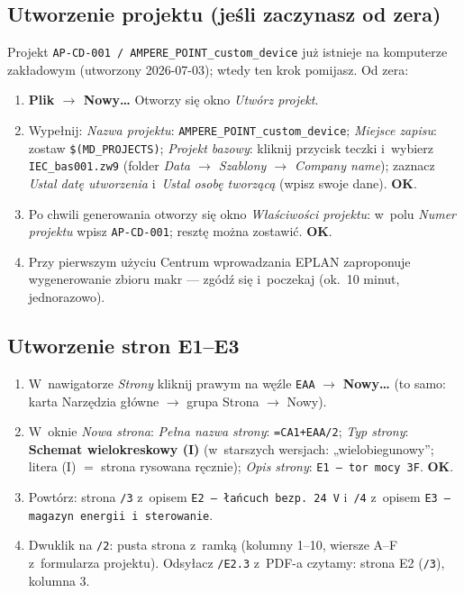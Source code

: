 \documentclass[11pt,a4paper]{article}
\begin{document}
\subsection{Utworzenie projektu (jeśli zaczynasz od zera)}
Projekt \texttt{AP-CD-001 / AMPERE\_POINT\_custom\_device} już istnieje na komputerze zakładowym
(utworzony 2026-07-03); wtedy ten krok pomijasz. Od zera:
\begin{enumerate}
\item \textbf{Plik $\to$ Nowy\ldots} Otworzy się okno \emph{Utwórz projekt}.
\item Wypełnij: \emph{Nazwa projektu}: \texttt{AMPERE\_POINT\_custom\_device}; \emph{Miejsce zapisu}:
zostaw \texttt{\$(MD\_PROJECTS)}; \emph{Projekt bazowy}: kliknij przycisk teczki i~wybierz
\texttt{IEC\_bas001.zw9} (folder \emph{Data $\to$ Szablony $\to$ Company name}); zaznacz
\emph{Ustal datę utworzenia} i~\emph{Ustal osobę tworzącą} (wpisz swoje dane). \textbf{OK}.
\item Po chwili generowania otworzy się okno \emph{Właściwości projektu}: w~polu \emph{Numer
projektu} wpisz \texttt{AP-CD-001}; resztę można zostawić. \textbf{OK}.
\item Przy pierwszym użyciu Centrum wprowadzania EPLAN zaproponuje wygenerowanie zbioru makr ---
zgódź się i~poczekaj (ok.~10 minut, jednorazowo).
\end{enumerate}

\subsection{Utworzenie stron E1--E3}
\begin{enumerate}
\item W~nawigatorze \emph{Strony} kliknij prawym na węźle \texttt{EAA} $\to$ \textbf{Nowy\ldots}
(to samo: karta Narzędzia główne $\to$ grupa Strona $\to$ Nowy).
\item W~oknie \emph{Nowa strona}: \emph{Pełna nazwa strony}: \texttt{=CA1+EAA/2}; \emph{Typ strony}:
\textbf{Schemat wielokreskowy (I)} (w~starszych wersjach: „wielobiegunowy''; litera (I) $=$ strona
rysowana ręcznie); \emph{Opis strony}: \texttt{E1 --- tor mocy 3F}. \textbf{OK}.
\item Powtórz: strona \texttt{/3} z~opisem \texttt{E2 --- łańcuch bezp. 24 V} i~\texttt{/4} z~opisem
\texttt{E3 --- magazyn energii i sterowanie}.
\item Dwuklik na \texttt{/2}: pusta strona z~ramką (kolumny 1--10, wiersze A--F z~formularza projektu).
Odsyłacz \texttt{/E2.3} z~PDF-a czytamy: strona E2 (\texttt{/3}), kolumna 3.
\end{enumerate}
\end{document}
